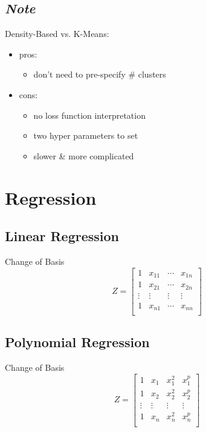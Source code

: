 \documentclass[10pt,landscape,a4paper]{article}
\begin{document}
\begin{multicols*}{5}
\subsection{\emph{Note}}
Density-Based vs. K-Means:
\begin{itemize}
    \item pros:
    \begin{itemize}
        \item don't need to pre-specify \# clusters
    \end{itemize}
    \item cons:
    \begin{itemize}
        \item no loss function interpretation
        \item two hyper parameters to set
        \item slower \& more complicated
    \end{itemize}
\end{itemize}

\section{Regression}

\subsection{Linear Regression}
Change of Basis
\begin{dmath*}
    Z =
    \begin{bmatrix}
        1 & x_{11} & \cdots & x_{1n} \\
        1 & x_{21} & \cdots & x_{2n} \\
        \vdots & \vdots & \vdots & \vdots \\
        1 & x_{n1} & \cdots & x_{nn} \\
    \end{bmatrix}
\end{dmath*}

\subsection{Polynomial Regression}
Change of Basis
\begin{dmath*}
    Z =
    \begin{bmatrix}
        1 & x_1 & x_1^2 & x_1^p \\
        1 & x_2 & x_2^2 & x_2^p \\
        \vdots & \vdots & \vdots & \vdots \\
        1 & x_n & x_n^2 & x_n^p \\
    \end{bmatrix}
\end{dmath*}


\end{multicols*}
\end{document}
